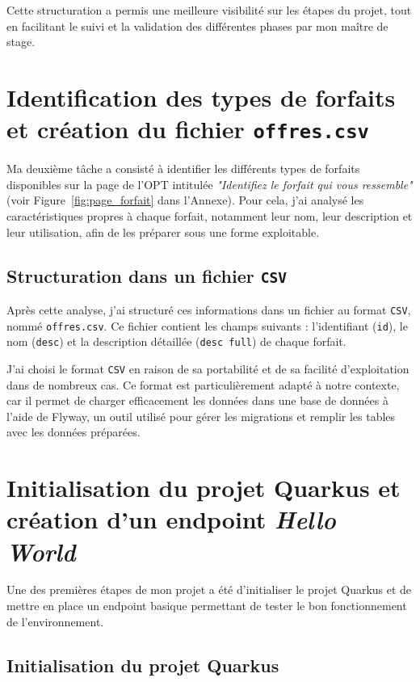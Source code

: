 \documentclass[11pt]{article}
\begin{document}
		 Cette structuration a permis une meilleure visibilité sur les étapes du projet, tout en facilitant le suivi et la validation des différentes phases par mon maître de stage.
		\section{Identification des types de forfaits et création du fichier \texttt{offres.csv}}
		
		Ma deuxième tâche a consisté à identifier les différents types de forfaits disponibles sur la page de l’OPT intitulée \textit{"Identifiez le forfait qui vous ressemble"} (voir Figure~\ref{fig:page_forfait} dans l'Annexe). Pour cela, j’ai analysé les caractéristiques propres à chaque forfait, notamment leur nom, leur description et leur utilisation, afin de les préparer sous une forme exploitable.
		
		\subsection*{Structuration dans un fichier \texttt{CSV}}
		Après cette analyse, j’ai structuré ces informations dans un fichier au format \texttt{CSV}, nommé \texttt{offres.csv}. Ce fichier contient les champs suivants : l’identifiant (\texttt{id}), le nom (\texttt{desc}) et la description détaillée (\texttt{desc full}) de chaque forfait.
		
		J’ai choisi le format \texttt{CSV} en raison de sa portabilité et de sa facilité d’exploitation dans de nombreux cas. Ce format est particulièrement adapté à notre contexte, car il permet de charger efficacement les données dans une base de données à l’aide de Flyway, un outil utilisé pour gérer les migrations et remplir les tables avec les données préparées.
		
		\section{Initialisation du projet Quarkus et création d’un endpoint \textit{Hello World}}
		
		Une des premières étapes de mon projet a été d’initialiser le projet Quarkus et de mettre en place un endpoint basique permettant de tester le bon fonctionnement de l’environnement.
		
		\subsection{Initialisation du projet Quarkus}
		
\end{document}
